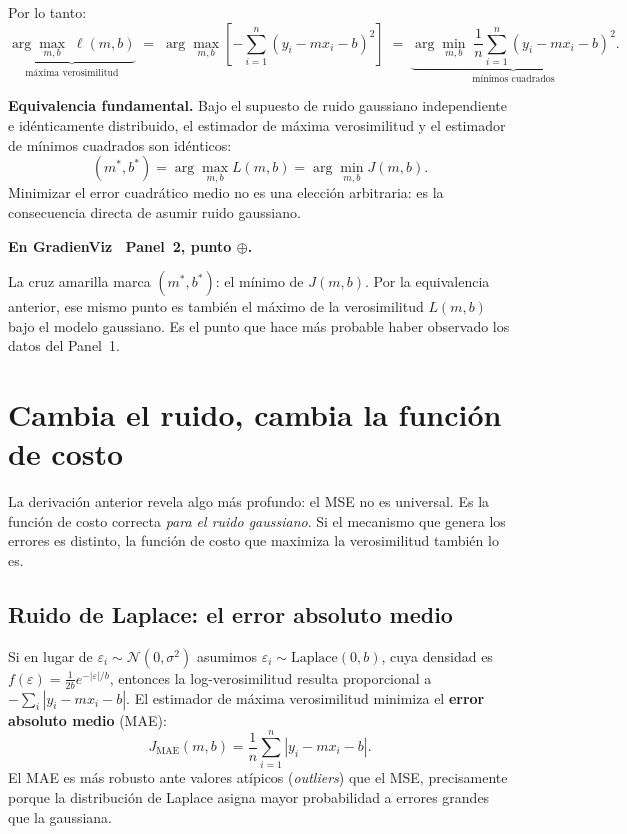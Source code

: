 \documentclass[12pt, a4paper]{article}
\newenvironment{viznota}[1]{%
    \begin{mdframed}[style=vizverde]
    \textbf{\color{bordeteo}En GradienViz \textemdash\ #1.}\quad
}{%
    \end{mdframed}
}
\newenvironment{vizdef}{%
    \begin{mdframed}[style=vizazul]
}{%
    \end{mdframed}
}
\newcommand{\mstar}{m^{*}}
\newcommand{\bstar}{b^{*}}
\begin{document}
Por lo tanto:
\[
    \underbrace{\arg\max_{m,b}\; \ell(m,b)}_{\text{máxima verosimilitud}}
    \;=\;
    \arg\max_{m,b}\left[-\sum_{i=1}^{n}(y_i - mx_i - b)^2\right]
    \;=\;
    \underbrace{\arg\min_{m,b}\;\frac{1}{n}\sum_{i=1}^{n}(y_i - mx_i - b)^2}_{\text{mínimos cuadrados}}.
\]

\begin{vizdef}
\textbf{Equivalencia fundamental.} Bajo el supuesto de ruido gaussiano
independiente e idénticamente distribuido, el estimador de máxima
verosimilitud y el estimador de mínimos cuadrados son idénticos:
\[
    (\mstar, \bstar) = \arg\max_{m,b} L(m,b) = \arg\min_{m,b} J(m,b).
\]
Minimizar el error cuadrático medio no es una elección arbitraria:
es la consecuencia directa de asumir ruido gaussiano.
\end{vizdef}

\begin{viznota}{Panel~2, punto $\oplus$}
La cruz amarilla marca $(\mstar, \bstar)$: el mínimo de $J(m,b)$.
Por la equivalencia anterior, ese mismo punto es también el máximo
de la verosimilitud $L(m,b)$ bajo el modelo gaussiano. Es el punto
que hace más probable haber observado los datos del Panel~1.
\end{viznota}

\section{Cambia el ruido, cambia la función de costo}

La derivación anterior revela algo más profundo: el MSE no es
universal. Es la función de costo correcta \emph{para el ruido gaussiano}.
Si el mecanismo que genera los errores es distinto, la función de costo
que maximiza la verosimilitud también lo es.

\subsection{Ruido de Laplace: el error absoluto medio}

Si en lugar de $\varepsilon_i \sim \mathcal{N}(0, \sigma^2)$ asumimos
$\varepsilon_i \sim \text{Laplace}(0, b)$, cuya densidad es
$f(\varepsilon) = \frac{1}{2b}e^{-|\varepsilon|/b}$, entonces la
log-verosimilitud resulta proporcional a $-\sum_i |y_i - mx_i - b|$.
El estimador de máxima verosimilitud minimiza el
\textbf{error absoluto medio} (MAE):
\[
    J_{\text{MAE}}(m, b) = \frac{1}{n}\sum_{i=1}^{n}|y_i - mx_i - b|.
\]
El MAE es más robusto ante valores atípicos (\emph{outliers}) que el MSE,
precisamente porque la distribución de Laplace asigna mayor probabilidad
a errores grandes que la gaussiana.
\end{document}
